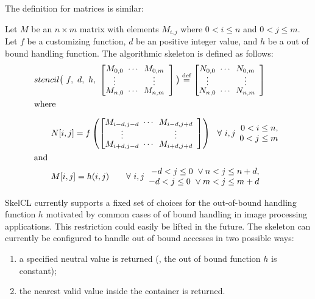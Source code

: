 \noindent
The definition for matrices is similar:
\begin{definition}
  \label{definition:mapoverlap:matrix}
  Let $M$ be an $n\times m$ matrix with elements $M_{i,j}$ where $0 < i \leq n$ and $0 < j \leq m$.
  Let $f$ be a customizing function, $d$ be an positive integer value, and $h$ be a out of bound handling function.
  The algorithmic skeleton \stencil is defined as follows:
  \begin{equation*}
    \begin{split}
    & stencil \big(\ f,\  d,\ h,\ \DottedMatrix{M_{0,0}}{M_{0,m}}{M_{n,0}}{M_{n,m}}\big)
               \eqdef \DottedMatrix{N_{0,0}}{N_{0,m}}{N_{n,0}}{N_{n,m}}\\
               &\text{where}\\[.5em]
    &\qquad N[i,j] = f\left(\DottedMatrix{M_{i-d,j-d}}{M_{i-d,j+d}}{M_{i+d,j-d}}{M_{i+d,j+d}}\right)\ \ \forall\ i,j
        \begin{array}{r} 0 < i \leq n,\\ 0 < j \leq m \end{array}\\
        &\text{and}\\
    &\qquad M[i,j] = h(i,j) \qquad \forall\ i,j \begin{array}{r} -d < j \leq 0\ \vee n < j \leq n+d,\\ -d < j \leq 0\ \vee m < j \leq m+d \end{array}
    \end{split}
  \end{equation*}
\end{definition}


SkelCL currently supports a fixed set of choices for the out-of-bound handling function $h$ motivated by common cases of of bound handling in image processing applications.
This restriction could easily be lifted in the future.
The \stencil skeleton can currently be configured to handle out of bound accesses in two possible ways:
\begin{enumerate}
  \item a specified neutral value is returned (\ie, the out of bound function $h$ is constant);
  \item the nearest valid value inside the container is returned.
\end{enumerate}

